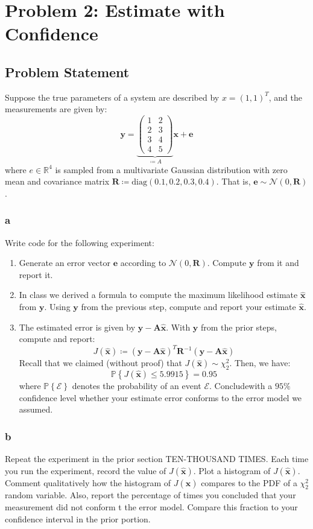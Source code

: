 \documentclass[11pt]{report}
\theoremstyle{definition}
\newcommand{\mat}[1]{\mathbf{#1}}
\begin{document}
\section*{Problem 2: Estimate with Confidence}
\subsection*{Problem Statement}
Suppose the true parameters of a system are described by $x=(1,1)^T$, and the measurements
are given by:
\[
	\mat{y} = \underbrace{\begin{pmatrix}
			1 & 2 \\
			2 & 3 \\
			3 & 4 \\
			4 & 5
		\end{pmatrix}}_{\coloneqq A}
	\mat{x} + \mat{e}
\]
where $e\in\mathbb{R}^4$ is sampled from a multivariate Gaussian distribution with zero mean and covariance
matrix $\mat{R}\coloneqq \textrm{diag}(0.1, 0.2, 0.3, 0.4)$. That is, $\mat{e}\sim\mathcal{N}(0, \mat{R})$.
\subsubsection*{a}
Write code for the following experiment:
\begin{enumerate}
	\item Generate an error vector $\mat{e}$ according to $\mathcal{N}(0,\mat{R})$.
	      Compute $\mat{y}$ from it and report it.
	\item In class we derived a formula to compute the maximum likelihood
	      estimate $\hat{\mat{x}}$ from $\mat{y}$. Using $\mat{y}$ from the previous
	      step, compute and report your estimate $\hat{\mat{x}}$.
	\item The estimated error is given by $\mat{y}-\mat{A}\hat{\mat{x}}$. With
	      $\mat{y}$ from the prior steps, compute and report:
	      \[J(\hat{\mat{x}}) \coloneqq (\mat{y}-\mat{A}\hat{\mat{x}})^T\mat{R}^{-1}(\mat{y}-\mat{A}\hat{\mat{x}})\]
	      Recall that we claimed (without proof) that
	      $J(\hat{\mat{x}})\sim \chi_2^2$. Then, we have:
	      \[\mathbb{P}\left\{J(\hat{\mat{x}})\leq 5.9915\right\}=0.95\]
	      where $\mathbb{P}\left\{\mathcal{E}\right\}$ denotes the probability
	      of an event $\mathcal{E}$. Concludewith a $95\%$ confidence level
	      whether your estimate error conforms to the error model we assumed.
\end{enumerate}
\subsubsection*{b}
Repeat the experiment in the prior section TEN-THOUSAND TIMES. Each time you run
the experiment, record the value of $J(\hat{\mat{x}})$.  Plot a histogram of
$J(\hat{\mat{x}})$. Comment qualitatively how the histogram of
$J(\hat{\mat{x}})$ compares to the PDF of a $\chi_2^2$ random variable. Also,
report the percentage of times you concluded that your measurement did not
conform t the error model. Compare this fraction to your confidence interval in
the prior portion.
\end{document}
